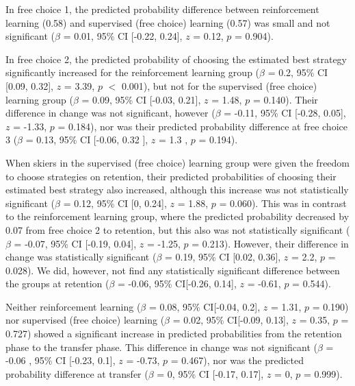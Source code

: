 \documentclass[pdflatex,sn-mathphys-num]{sn-jnl}%
\theoremstyle{thmstyleone}%
\theoremstyle{thmstyletwo}%
\theoremstyle{thmstylethree}%
\begin{document}
In free choice 1, the predicted probability difference between reinforcement learning (0.58) and supervised (free choice) learning (0.57) was small and not significant ($\beta$ = 0.01, 95\% CI [-0.22, 0.24], $z$ = 0.12, $p$ = 0.904). 

In free choice 2, the predicted probability of choosing the estimated best strategy significantly increased for the reinforcement learning group ($\beta$ = 0.2, 95\% CI [0.09, 0.32], $z$ = 3.39, $p$  $<$ 0.001), but not for the supervised (free choice) learning group ($\beta$ = 0.09, 95\% CI [-0.03, 0.21], $z$ = 1.48, $p$ = 0.140). Their difference in change was not significant, however ($\beta$ = -0.11, 95\% CI [-0.28, 0.05], $z$ = -1.33, $p$ = 0.184), nor was their predicted probability difference at free choice 3 ($\beta$ = 0.13, 95\% CI [-0.06, 0.32 ], $z$ = 1.3 , $p$  =  0.194).

When skiers in the supervised (free choice) learning group were given the freedom to choose strategies on retention, their predicted probabilities of choosing their estimated best strategy also increased, although this increase was not statistically significant ($\beta$ = 0.12, 95\% CI [0, 0.24], $z$ = 1.88, $p$ = 0.060). This was in contrast to the reinforcement learning group, where the predicted probability decreased by 0.07 from free choice 2 to retention, but this also was not statistically significant ($\beta$ = -0.07, 95\% CI [-0.19, 0.04], $z$ = -1.25, $p$ = 0.213). However, their difference in change was statistically significant ($\beta$ = 0.19, 95\% CI [0.02, 0.36], $z$ = 2.2, $p$ = 0.028). We did, however,  not find any statistically significant difference between the groups at retention ($\beta$ = -0.06, 95\% CI[-0.26, 0.14], $z$ = -0.61, $p$ = 0.544).

Neither reinforcement learning ($\beta$ = 0.08, 95\% CI[-0.04, 0.2], $z$ = 1.31, $p$ = 0.190) nor supervised (free choice) learning ($\beta$ = 0.02, 95\% CI[-0.09, 0.13], $z$ = 0.35, $p$ = 0.727) showed a significant increase in predicted probabilities from the retention phase to the transfer phase. This difference in change was not significant ($\beta$ = -0.06 , 95\% CI [-0.23, 0.1], $z$ = -0.73, $p$ = 0.467), nor was the predicted probability difference at transfer ($\beta$ = 0, 95\% CI [-0.17, 0.17], $z$ = 0, $p$ = 0.999).
\end{document}
